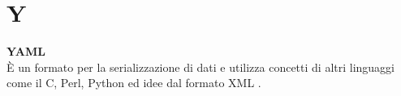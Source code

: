 \section{Y}
\textbf{YAML}\\
È un formato per la serializzazione di dati e utilizza concetti di altri linguaggi come il C, Perl, Python ed idee dal formato XML .\\ \\

\clearpage